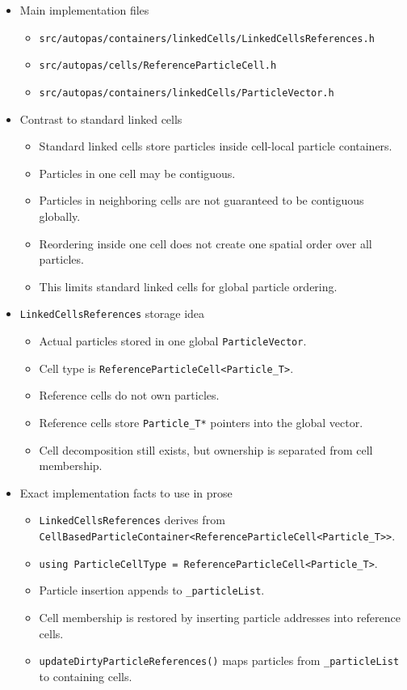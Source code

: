 \begin{itemize}
    \item Main implementation files
    \begin{itemize}
        \item \texttt{src/autopas/containers/linkedCells/LinkedCellsReferences.h}
        \item \texttt{src/autopas/cells/ReferenceParticleCell.h}
        \item \texttt{src/autopas/containers/linkedCells/ParticleVector.h}
    \end{itemize}

    \item Contrast to standard linked cells
    \begin{itemize}
        \item Standard linked cells store particles inside cell-local particle containers.
        \item Particles in one cell may be contiguous.
        \item Particles in neighboring cells are not guaranteed to be contiguous globally.
        \item Reordering inside one cell does not create one spatial order over all particles.
        \item This limits standard linked cells for global particle ordering.
    \end{itemize}

    \item \texttt{LinkedCellsReferences} storage idea
    \begin{itemize}
        \item Actual particles stored in one global \texttt{ParticleVector}.
        \item Cell type is \texttt{ReferenceParticleCell<Particle\_T>}.
        \item Reference cells do not own particles.
        \item Reference cells store \texttt{Particle\_T*} pointers into the global vector.
        \item Cell decomposition still exists, but ownership is separated from cell membership.
    \end{itemize}

    \item Exact implementation facts to use in prose
    \begin{itemize}
        \item \texttt{LinkedCellsReferences} derives from \texttt{CellBasedParticleContainer<ReferenceParticleCell<Particle\_T>>}.
        \item \texttt{using ParticleCellType = ReferenceParticleCell<Particle\_T>}.
        \item Particle insertion appends to \texttt{\_particleList}.
        \item Cell membership is restored by inserting particle addresses into reference cells.
        \item \texttt{updateDirtyParticleReferences()} maps particles from \texttt{\_particleList} to containing cells.
    \end{itemize}


\end{itemize}
